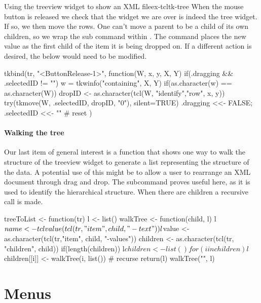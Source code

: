 \begin{example}{Using the treeview widget to show an XML file}{ex-tcltk-tree}
When the mouse button is released we check that the widget we are over
is indeed the tree widget. If so, we then move the rows. One can't
move a parent to be a child of its own children, so we wrap the
 sub command within . The
 command places the new value as the first child of the
item it is being dropped on. If a different action is desired, the
 below would need to be modified.
\begin{Schunk}
\begin{Sinput}
 tkbind(tr, "<ButtonRelease-1>", function(W, x, y, X, Y) {
   if(.dragging && .selectedID != "") {
     w = tkwinfo("containing", X, Y)
     if(as.character(w) == as.character(W)) {
       dropID <- as.character(tcl(W, "identify","row", x, y))
       try(tkmove(W, .selectedID, dropID, "0"), silent=TRUE)
     }
   }
   .dragging <<- FALSE; .selectedID <<- "" # reset
 })
\end{Sinput}
\end{Schunk}

\paragraph{Walking the tree}
Our last item of general interest is a function that shows one way to
walk the structure of the treeview widget to generate a list
representing the structure of the data.  A potential use of this might
be to allow a user to rearrange an XML document through drag and drop.
The subcommand  proves useful here,
as it is used to identify the hierarchical structure. When there are children a recursive call is made.



\begin{Schunk}
\begin{Sinput}
 treeToList <- function(tr) {
   l <- list()
   walkTree <- function(child, l) {
     l$name <- tclvalue(tcl(tr,"item", child, "-text"))
     l$value <- as.character(tcl(tr,"item", child, "-values"))
     children <- as.character(tcl(tr, "children", child)) 
     if(length(children)) {
       l$children <- list()
       for(i in children) 
         l$children[[i]] <- walkTree(i, list()) # recurse
     }
     return(l)
   }
   walkTree("", l)
 }
\end{Sinput}
\end{Schunk}
\end{example}



\section{Menus}
\label{sec:tcltk:menus}


